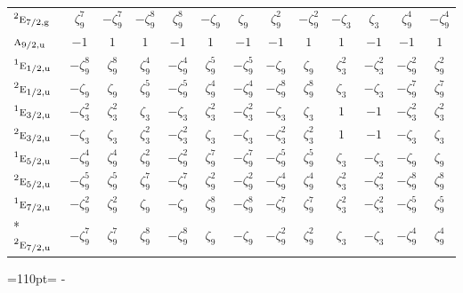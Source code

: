\documentclass[10pt,a4paper]{article}
\newcommand{\needspace}[1]{\par\penalty-100\begingroup\dimen0=#1\relax\dimen2=\pagegoal
  \advance\dimen2-\pagetotal\ifdim\dimen0>\dimen2\relax\ifdim\dimen2>0pt\vfil\break\fi\fi
  \endgroup}
\numberwithin{equation}{section}
\newcommand{\irr}[1]{\text{\normalfont\scshape #1}}
\newcommand{\conjpair}[1]{{}^{#1}}
\newcommand{\ptag}[1]{\mathrm{#1}}
\newcommand{\rootunity}[1]{\zeta_{#1}}
\begin{document}
{\begin{longtable}{@{}lcccccccccccc@{}}
$\conjpair{2}\irr{e}_{7/2,\ptag{g}}$ & $\rootunity{9}^{7}$ & $-\rootunity{9}^{7}$ & $-\rootunity{9}^{8}$ & $\rootunity{9}^{8}$ & $-\rootunity{9}$ & $\rootunity{9}$ & $\rootunity{9}^{2}$ & $-\rootunity{9}^{2}$ & $-\rootunity{3}$ & $\rootunity{3}$ & $\rootunity{9}^{4}$ & $-\rootunity{9}^{4}$\\
$\irr{a}_{9/2,\ptag{u}}$ & $-1$ & $1$ & $1$ & $-1$ & $1$ & $-1$ & $-1$ & $1$ & $1$ & $-1$ & $-1$ & $1$\\
$\conjpair{1}\irr{e}_{1/2,\ptag{u}}$ & $-\rootunity{9}^{8}$ & $\rootunity{9}^{8}$ & $\rootunity{9}^{4}$ & $-\rootunity{9}^{4}$ & $\rootunity{9}^{5}$ & $-\rootunity{9}^{5}$ & $-\rootunity{9}$ & $\rootunity{9}$ & $\rootunity{3}^{2}$ & $-\rootunity{3}^{2}$ & $-\rootunity{9}^{2}$ & $\rootunity{9}^{2}$\\
$\conjpair{2}\irr{e}_{1/2,\ptag{u}}$ & $-\rootunity{9}$ & $\rootunity{9}$ & $\rootunity{9}^{5}$ & $-\rootunity{9}^{5}$ & $\rootunity{9}^{4}$ & $-\rootunity{9}^{4}$ & $-\rootunity{9}^{8}$ & $\rootunity{9}^{8}$ & $\rootunity{3}$ & $-\rootunity{3}$ & $-\rootunity{9}^{7}$ & $\rootunity{9}^{7}$\\
$\conjpair{1}\irr{e}_{3/2,\ptag{u}}$ & $-\rootunity{3}^{2}$ & $\rootunity{3}^{2}$ & $\rootunity{3}$ & $-\rootunity{3}$ & $\rootunity{3}^{2}$ & $-\rootunity{3}^{2}$ & $-\rootunity{3}$ & $\rootunity{3}$ & $1$ & $-1$ & $-\rootunity{3}^{2}$ & $\rootunity{3}^{2}$\\
$\conjpair{2}\irr{e}_{3/2,\ptag{u}}$ & $-\rootunity{3}$ & $\rootunity{3}$ & $\rootunity{3}^{2}$ & $-\rootunity{3}^{2}$ & $\rootunity{3}$ & $-\rootunity{3}$ & $-\rootunity{3}^{2}$ & $\rootunity{3}^{2}$ & $1$ & $-1$ & $-\rootunity{3}$ & $\rootunity{3}$\\
$\conjpair{1}\irr{e}_{5/2,\ptag{u}}$ & $-\rootunity{9}^{4}$ & $\rootunity{9}^{4}$ & $\rootunity{9}^{2}$ & $-\rootunity{9}^{2}$ & $\rootunity{9}^{7}$ & $-\rootunity{9}^{7}$ & $-\rootunity{9}^{5}$ & $\rootunity{9}^{5}$ & $\rootunity{3}$ & $-\rootunity{3}$ & $-\rootunity{9}$ & $\rootunity{9}$\\
$\conjpair{2}\irr{e}_{5/2,\ptag{u}}$ & $-\rootunity{9}^{5}$ & $\rootunity{9}^{5}$ & $\rootunity{9}^{7}$ & $-\rootunity{9}^{7}$ & $\rootunity{9}^{2}$ & $-\rootunity{9}^{2}$ & $-\rootunity{9}^{4}$ & $\rootunity{9}^{4}$ & $\rootunity{3}^{2}$ & $-\rootunity{3}^{2}$ & $-\rootunity{9}^{8}$ & $\rootunity{9}^{8}$\\
$\conjpair{1}\irr{e}_{7/2,\ptag{u}}$ & $-\rootunity{9}^{2}$ & $\rootunity{9}^{2}$ & $\rootunity{9}$ & $-\rootunity{9}$ & $\rootunity{9}^{8}$ & $-\rootunity{9}^{8}$ & $-\rootunity{9}^{7}$ & $\rootunity{9}^{7}$ & $\rootunity{3}^{2}$ & $-\rootunity{3}^{2}$ & $-\rootunity{9}^{5}$ & $\rootunity{9}^{5}$\\*
$\conjpair{2}\irr{e}_{7/2,\ptag{u}}$ & $-\rootunity{9}^{7}$ & $\rootunity{9}^{7}$ & $\rootunity{9}^{8}$ & $-\rootunity{9}^{8}$ & $\rootunity{9}$ & $-\rootunity{9}$ & $-\rootunity{9}^{2}$ & $\rootunity{9}^{2}$ & $\rootunity{3}$ & $-\rootunity{3}$ & $-\rootunity{9}^{4}$ & $\rootunity{9}^{4}$\\
\bottomrule\end{longtable}}
\needspace{110pt}
\end{document}
